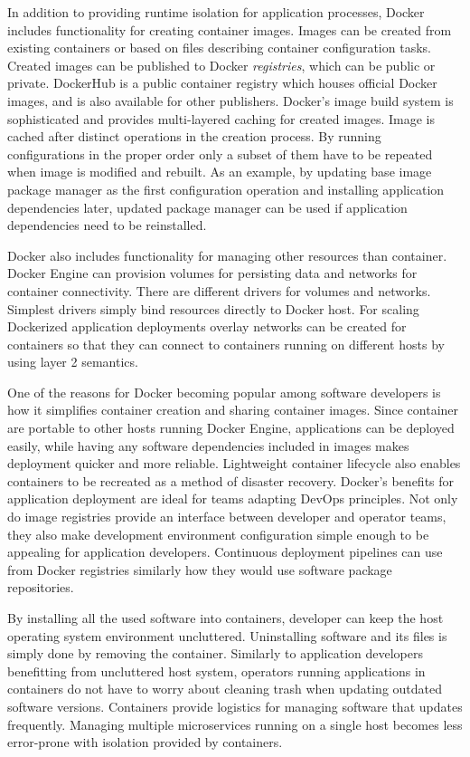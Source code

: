 In addition to providing runtime isolation for application processes, Docker
includes functionality for creating container images. Images can be created
from existing containers or based on files describing container configuration
tasks. Created images can be published to Docker \textit{registries}, which can
be public or private. DockerHub is a public container registry which houses
official Docker images, and is also available for other publishers. Docker's
image build system is sophisticated and provides multi-layered caching for
created images. Image is cached after distinct operations in the creation
process. By running configurations in the proper order only a subset of them
have to be repeated when image is modified and rebuilt. As an example, by
updating base image package manager as the first configuration operation and
installing application dependencies later, updated package manager can be used
if application dependencies need to be reinstalled.

Docker also includes functionality for managing other resources than container.
Docker Engine can provision volumes for persisting data and networks for
container connectivity. There are different drivers for volumes and networks.
Simplest drivers simply bind resources directly to Docker host. For scaling
Dockerized application deployments overlay networks can be created for
containers so that they can connect to containers running on different hosts by
using layer 2 semantics.

One of the reasons for Docker becoming popular among software developers is how
it simplifies container creation and sharing container images. Since container
are portable to other hosts running Docker Engine, applications can be deployed
easily, while having any software dependencies included in images makes
deployment quicker and more reliable. Lightweight container lifecycle also
enables containers to be recreated as a method of disaster recovery. Docker's
benefits for application deployment are ideal for teams adapting DevOps
principles. Not only do image registries provide an interface between developer
and operator teams, they also make development environment configuration simple
enough to be appealing for application developers. Continuous deployment
pipelines can use from Docker registries similarly how they would use software
package repositories.

By installing all the used software into containers, developer can keep the
host operating system environment uncluttered. Uninstalling software and its
files is simply done by removing the container. Similarly to application
developers benefitting from uncluttered host system, operators running
applications in containers do not have to worry about cleaning trash when
updating outdated software versions. Containers provide logistics for managing
software that updates frequently. Managing multiple microservices running on a
single host becomes less error-prone with isolation provided by containers.

